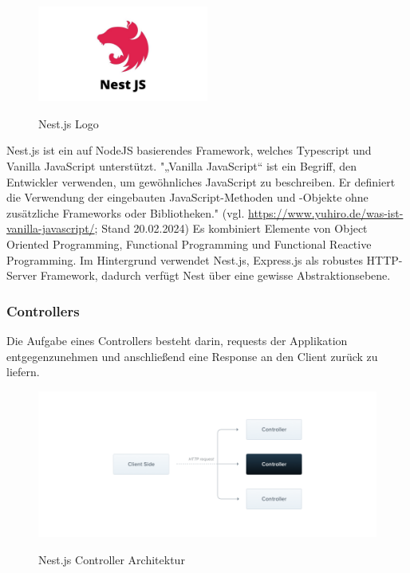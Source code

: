 \begin{figure}[h]
    \centering
    \includegraphics[width=0.5\textwidth]{pics/nest_js_logo.jpg}
    \caption{Nest.js Logo}
    \cite{Nest_js_logo}
    \label{fig:mesh1}
\end{figure}

Nest.js ist ein auf NodeJS basierendes Framework, welches Typescript und Vanilla JavaScript unterstützt. 
\newline
"„Vanilla JavaScript“ ist ein Begriff, den Entwickler verwenden, um gewöhnliches JavaScript zu beschreiben. Er definiert die Verwendung der eingebauten JavaScript-Methoden und -Objekte ohne zusätzliche Frameworks oder Bibliotheken."
\newline
(vgl. \url{https://www.yuhiro.de/was-ist-vanilla-javascript/}; Stand 20.02.2024)
\newline
Es kombiniert Elemente von Object Oriented Programming, Functional Programming und Functional Reactive Programming. Im Hintergrund verwendet Nest.js, Express.js als robustes HTTP-Server Framework, dadurch verfügt Nest über eine gewisse Abstraktionsebene.
\cite{Nest_js_Introduction}

\subsubsection{Controllers}
Die Aufgabe eines Controllers besteht darin, requests der Applikation entgegenzunehmen und anschließend eine Response an den Client zurück zu liefern.

\begin{figure}[h]
    \centering
    \includegraphics[width=1\textwidth]{pics/Nest_js_Controller.png}
    \caption{Nest.js Controller Architektur}
    \cite{Nest_js_Controller_Architektur}
    \label{fig:mesh1}
\end{figure}

